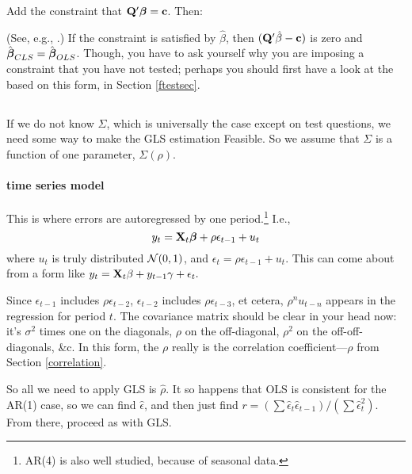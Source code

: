Add the constraint that ${\bf Q}'{\mbox{\boldmath$\beta$}}={\bf c}$. Then:

(See, e.g., \cite{amemiya:ez}.)
If the constraint is satisfied by $\hat\beta$, then
$({\bf Q}'\hat\beta-{\bf c})$ is zero and $\hat{{\mbox{\boldmath$\beta$}}}_{CLS}=\hat{{\mbox{\boldmath$\beta$}}}_{OLS}$.
Though, you have to ask yourself why you are imposing a constraint that
you have not tested; perhaps you should first have a look at the 
based on this form, in Section \ref{ftestsec}.

\subsection{} 

If we do not know $\Sigma$, which is universally the case except on
test questions, we need some way to make the GLS estimation Feasible. So we
assume that $\Sigma$ is a function of one parameter, $\Sigma(\rho)$.

\label{ts}
\paragraph{ time series model}

This is where errors are autoregressed by one period.\footnote{AR(4) is
also well studied, because of seasonal data.} I.e.,
$$y_t={\bf X}_t{\mbox{\boldmath$\beta$}} + \rho\epsilon_{t-1} + u_t$$
where $u_t$ is truly distributed ${\cal N}(0,1)$, and $\epsilon_t=
\rho\epsilon_{t-1} + u_t$. This can come about from  a form like
$y_t={\bf X}_t\beta + y_{t-1}\gamma + \epsilon_t.$


Since $\epsilon_{t-1}$ includes $\rho\epsilon_{t-2}$, 
$\epsilon_{t-2}$ includes $\rho\epsilon_{t-3}$, et cetera,
$\rho^n u_{t-n}$
appears in the regression for period $t$. The covariance matrix should
be clear in your head now: it's $\sigma^2$ times one on the diagonals,
$\rho$ on the off-diagonal, $\rho^2$ on the off-off-diagonals, \&c. In
this form, the $\rho$ really is the correlation coefficient---$\rho$
from Section \ref{correlation}.

So all we need to apply GLS is $\hat\rho$. It so happens that OLS is
consistent for the AR(1) case, so we can find $\hat\epsilon$, and then
just find $r=(\sum \hat\epsilon_t \hat\epsilon_{t-1})/(\sum
\hat\epsilon_t^2)$. From there, proceed as with GLS.


